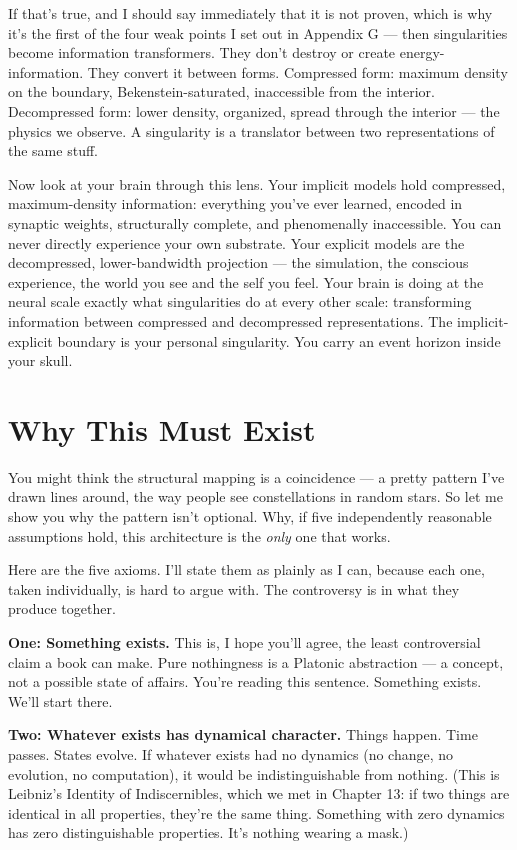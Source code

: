 \documentclass[11pt, twoside, openright]{book}
\begin{document}
If that's true, and I should say immediately that it is not proven, which is why it's the first of the four weak points I set out in Appendix G --- then singularities become information transformers. They don't destroy or create energy-information. They convert it between forms. Compressed form: maximum density on the boundary, Bekenstein-saturated, inaccessible from the interior. Decompressed form: lower density, organized, spread through the interior --- the physics we observe. A singularity is a translator between two representations of the same stuff.

Now look at your brain through this lens. Your implicit models hold compressed, maximum-density information: everything you've ever learned, encoded in synaptic weights, structurally complete, and phenomenally inaccessible. You can never directly experience your own substrate. Your explicit models are the decompressed, lower-bandwidth projection --- the simulation, the conscious experience, the world you see and the self you feel. Your brain is doing at the neural scale exactly what singularities do at every other scale: transforming information between compressed and decompressed representations. The implicit-explicit boundary is your personal singularity. You carry an event horizon inside your skull.

\section*{Why This Must Exist}

You might think the structural mapping is a coincidence --- a pretty pattern I've drawn lines around, the way people see constellations in random stars. So let me show you why the pattern isn't optional. Why, if five independently reasonable assumptions hold, this architecture is the \textit{only} one that works.

Here are the five axioms. I'll state them as plainly as I can, because each one, taken individually, is hard to argue with. The controversy is in what they produce together.

\textbf{One: Something exists.} This is, I hope you'll agree, the least controversial claim a book can make. Pure nothingness is a Platonic abstraction --- a concept, not a possible state of affairs. You're reading this sentence. Something exists. We'll start there.

\textbf{Two: Whatever exists has dynamical character.} Things happen. Time passes. States evolve. If whatever exists had no dynamics (no change, no evolution, no computation), it would be indistinguishable from nothing. (This is Leibniz's Identity of Indiscernibles, which we met in Chapter 13: if two things are identical in all properties, they're the same thing. Something with zero dynamics has zero distinguishable properties. It's nothing wearing a mask.)
\end{document}
